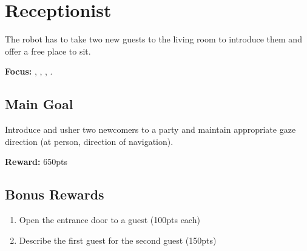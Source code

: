 \section{Receptionist}
\label{test:receptionist}
The robot has to take two new guests to the living room to introduce them and offer a free place to sit.

\noindent \textbf{Focus:} \SysI{}, \HRI{}, \PerDet{}, \PerRec.

\vspace{-5pt} %
\subsection*{Main Goal}
Introduce and usher two newcomers to a party and maintain appropriate gaze direction (at person, direction of navigation).

\noindent\textbf{Reward:} 650pts

\vspace{-5pt}
\subsection*{Bonus Rewards}
\begin{enumerate}[nosep]
	\item Open the entrance door to a guest (100pts each)
	\item Describe the first guest for the second guest (150pts)
\end{enumerate}


